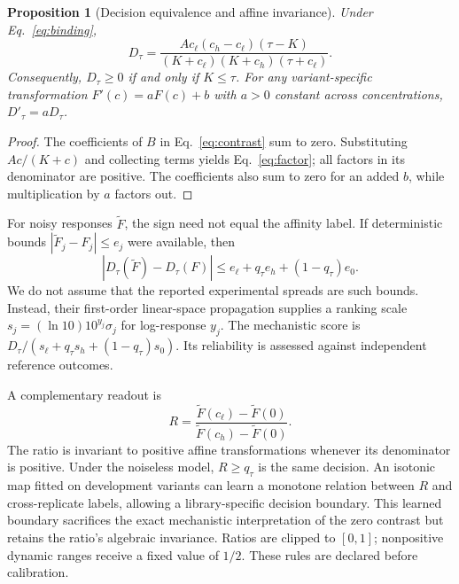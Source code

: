 \documentclass[11pt,letterpaper]{article}
\newtheorem{proposition}{Proposition}
\begin{document}
\begin{proposition}[Decision equivalence and affine invariance]
Under Eq.~\eqref{eq:binding},
\begin{equation}
 D_\tau=\frac{A c_\ell(c_h-c_\ell)(\tau-K)}{(K+c_\ell)(K+c_h)(\tau+c_\ell)}.
 \label{eq:factor}
\end{equation}
Consequently, $D_\tau\geq0$ if and only if $K\leq\tau$. For any variant-specific transformation $F'(c)=aF(c)+b$ with $a>0$ constant across concentrations, $D'_\tau=aD_\tau$.
\end{proposition}
\begin{proof}
The coefficients of $B$ in Eq.~\eqref{eq:contrast} sum to zero. Substituting $Ac/(K+c)$ and collecting terms yields Eq.~\eqref{eq:factor}; all factors in its denominator are positive. The coefficients also sum to zero for an added $b$, while multiplication by $a$ factors out.
\end{proof}

For noisy responses $\widetilde F$, the sign need not equal the affinity label. If deterministic bounds $|\widetilde F_j-F_j|\leq e_j$ were available, then
\begin{equation}
 |D_\tau(\widetilde F)-D_\tau(F)|\leq e_\ell+q_\tau e_h+(1-q_\tau)e_0.
 \label{eq:noise}
\end{equation}
We do not assume that the reported experimental spreads are such bounds. Instead, their first-order linear-space propagation supplies a ranking scale $s_j=(\ln10)10^{y_j}\sigma_j$ for log-response $y_j$. The mechanistic score is $D_\tau/(s_\ell+q_\tau s_h+(1-q_\tau)s_0)$. Its reliability is assessed against independent reference outcomes.

A complementary readout is
\begin{equation}
 R=\frac{\widetilde F(c_\ell)-\widetilde F(0)}{\widetilde F(c_h)-\widetilde F(0)}.
 \label{eq:ratio}
\end{equation}
The ratio is invariant to positive affine transformations whenever its denominator is positive. Under the noiseless model, $R\geq q_\tau$ is the same decision. An isotonic map fitted on development variants can learn a monotone relation between $R$ and cross-replicate labels, allowing a library-specific decision boundary. This learned boundary sacrifices the exact mechanistic interpretation of the zero contrast but retains the ratio's algebraic invariance. Ratios are clipped to $[0,1]$; nonpositive dynamic ranges receive a fixed value of $1/2$. These rules are declared before calibration.
\end{document}
